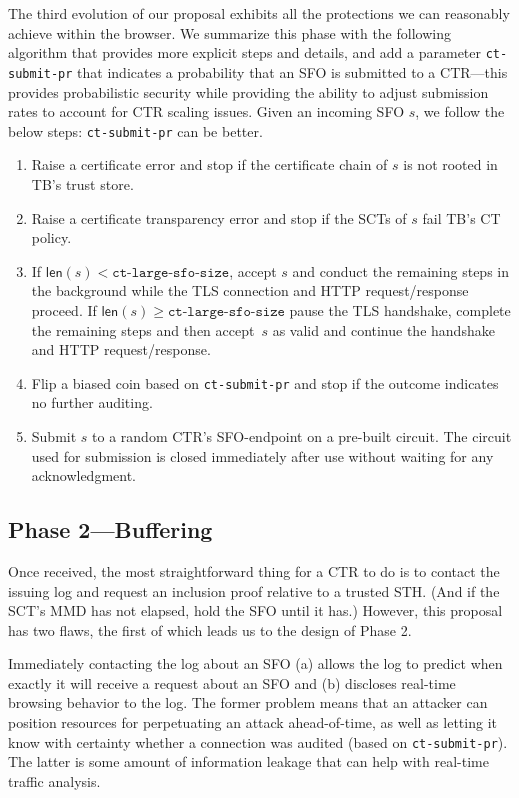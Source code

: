 The third evolution of our proposal exhibits all the protections we can
reasonably achieve within the browser. We summarize this phase with the
following algorithm that provides more explicit steps and details, and add a
parameter \texttt{ct-submit-pr} that indicates a probability that an SFO is
submitted to a CTR---this provides probabilistic security while providing the
ability to adjust submission rates to account for CTR scaling issues. Given an
incoming SFO $s$, we follow the below steps: %
\texttt{ct-submit-pr} can be better.

\begin{enumerate}
    \item Raise a certificate error and stop if the certificate chain of $s$
        is not rooted in TB's trust store.
    \item Raise a certificate transparency error and stop if the SCTs of $s$
        fail TB's CT policy.
    \item If $\mathsf{len}(s) < \texttt{ct-large-sfo-size}$, accept $s$ and
        conduct the remaining steps in the background while the TLS connection
        and HTTP request/response proceed. If $\mathsf{len}(s) \geq
        \texttt{ct-large-sfo-size}$ pause the TLS handshake, complete the
        remaining steps and then accept~$s$ as valid and continue the handshake
        and HTTP request/response.
    \item Flip a biased coin based on \texttt{ct-submit-pr} and stop if the
        outcome indicates no further auditing.
    \item Submit $s$ to a random CTR's SFO-endpoint on a pre-built circuit.
        The circuit used for submission is closed immediately after use without
        waiting for any acknowledgment.
\end{enumerate}

\subsection{Phase 2---Buffering} \label{sec:base:phase2}

Once received, the most straightforward thing for a CTR to do is to contact the
issuing log and request an inclusion proof relative to a trusted STH\@. (And if
the SCT's MMD has not elapsed, hold the SFO until it has.) However, this
proposal has two flaws, the first of which leads us to the design of Phase 2.

Immediately contacting the log about an SFO (a) allows the log to predict when
exactly it will receive a request about an SFO and (b) discloses real-time
browsing behavior to the log. The former problem means that an attacker can
position resources for perpetuating an attack ahead-of-time, as well as letting
it know with certainty whether a connection was audited (based on
\texttt{ct-submit-pr}). The latter is some amount of information leakage that
can help with real-time traffic analysis. 

